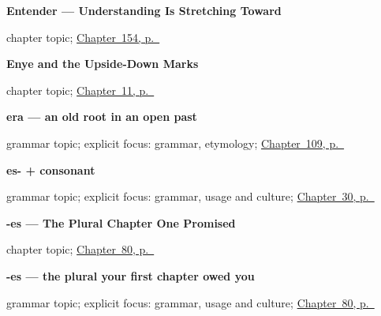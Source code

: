 \noindent\begin{minipage}[t]{\linewidth}
\raggedright
\textbf{Entender — Understanding Is Stretching Toward}\par
\footnotesize chapter topic; \hyperref[ch:spanish-entender]{Chapter~154, p.~\pageref*{ch:spanish-entender}}
\end{minipage}\par\smallskip

\noindent\begin{minipage}[t]{\linewidth}
\raggedright
\textbf{Enye and the Upside-Down Marks}\par
\footnotesize chapter topic; \hyperref[ch:enye-and-marks]{Chapter~11, p.~\pageref*{ch:enye-and-marks}}
\end{minipage}\par\smallskip

\noindent\begin{minipage}[t]{\linewidth}
\raggedright
\textbf{era — an old root in an open past}\par
\footnotesize grammar topic; explicit focus: grammar, etymology; \hyperref[ch:spanish-imperfecto-irregulares]{Chapter~109, p.~\pageref*{ch:spanish-imperfecto-irregulares}}
\end{minipage}\par\smallskip

\noindent\begin{minipage}[t]{\linewidth}
\raggedright
\textbf{es- + consonant}\par
\footnotesize grammar topic; explicit focus: grammar, usage and culture; \hyperref[ch:es-inicial]{Chapter~30, p.~\pageref*{ch:es-inicial}}
\end{minipage}\par\smallskip

\noindent\begin{minipage}[t]{\linewidth}
\raggedright
\textbf{-es --- The Plural Chapter One Promised}\par
\footnotesize chapter topic; \hyperref[ch:plural-es]{Chapter~80, p.~\pageref*{ch:plural-es}}
\end{minipage}\par\smallskip

\noindent\begin{minipage}[t]{\linewidth}
\raggedright
\textbf{-es — the plural your first chapter owed you}\par
\footnotesize grammar topic; explicit focus: grammar, usage and culture; \hyperref[ch:plural-es]{Chapter~80, p.~\pageref*{ch:plural-es}}
\end{minipage}\par\smallskip

